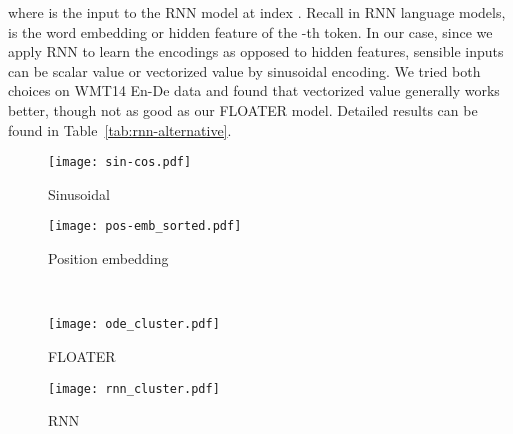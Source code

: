 \documentclass[11pt]{article}
\begin{document}
where  is the input to the RNN model at index . Recall in RNN language models,  is the word embedding or hidden feature of the -th token. In our case, since we apply RNN to learn the encodings as opposed to hidden features, sensible inputs can be scalar value  or vectorized value  by sinusoidal encoding. We tried both choices on WMT14 En-De data and found that vectorized value generally works better, though not as good as our FLOATER model. Detailed results can be found in Table~\ref{tab:rnn-alternative}.
\begin{figure*}
    \centering
    \begin{subfigure}{0.45\textwidth}
    \caption{Sinusoidal}\label{fig:sin-cos}
    \texttt{[image: sin-cos.pdf]}
    \end{subfigure}
    \begin{subfigure}{0.45\textwidth}
    \caption{Position embedding}\label{fig:pos-emb}
    \texttt{[image: pos-emb\_sorted.pdf]}
    \end{subfigure}\\
    \begin{subfigure}{0.45\textwidth}
    \texttt{[image: ode\_cluster.pdf]}\caption{FLOATER}\label{fig:flower}
    \end{subfigure}
    \begin{subfigure}{0.45\textwidth}
    \texttt{[image: rnn\_cluster.pdf]}\caption{RNN}\label{fig:rnn}
    \end{subfigure}
    \caption{Visualizing the four different position methods. All models are trained using the Transformer-base architecture and En-De dataset. For better visualization, dimension indices are permuted in Figure~\ref{fig:pos-emb}-\ref{fig:rnn}.}
    \label{fig:visualize-encoding}
\end{figure*}
\end{document}
